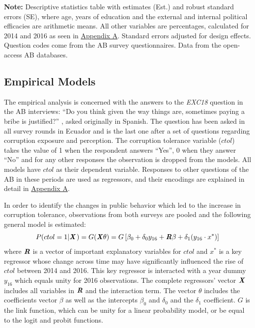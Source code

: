 \documentclass[12pt,a4]{article}\usepackage[]{graphicx}\usepackage[]{xcolor}
\begin{document}
\begin{table}[htbp!]
\begin{center}
\begin{tabular}{llcccc}
\bottomrule
\end{tabular}
\end{center}
\doublespacing
\textbf{Note:} Descriptive statistics table with estimates (Est.) and robust standard errors (SE), where age, years of education and the external and internal political efficacies are arithmetic means. All other variables are percentages, calculated for 2014 and 2016 as seen in \hyperref[app:first]{Appendix A}. Standard errors adjusted for design effects. Question codes come from the AB survey questionnaires. Data from the open-access AB databases.
\end{table}

\subsection{Empirical Models}

The empirical analysis is concerned with the answers to the \emph{EXC18} question in the AB interviews: 
\enquote{Do you think given the way things are, sometimes paying a bribe is justified?} \parencite[p.96]{Moscoso.2018}, asked originally in Spanish. The question has been asked in all survey rounds in Ecuador and is the last one after a set of questions regarding corruption exposure and perception. The corruption tolerance variable ($ctol$) takes the value of 1 when the respondent answers \enquote{Yes}, 0 when they answer \enquote{No} and for any other responses the observation is dropped from the models. All models have $ctol$ as their dependent variable. Responses to other questions of the AB in these periods are used as regressors, and their encodings are explained in detail in \href{app:first}{Appendix A}.

In order to identify the changes in public behavior which led to the increase in corruption tolerance, observations from both surveys are pooled and the following general model is estimated: 
\begin{equation}
\label{eqn:genmod}
P(ctol = 1 | \textbf{\textit{X}} \hspace{0.04cm}) = G (\textbf{\textit{X}} \theta ) = G \left[ \beta_0 + \delta_0 y_{16} + \textbf{\textit{R}}\beta + \delta_1 (y_{16} \cdot x^*) \right]
\end{equation}
where $\textbf{\textit{R}}$ is a vector of important explanatory variables for $ctol$ and $x^*$ is a key regressor whose change across time may have significantly influenced the rise of $ctol$ between 2014 and 2016. This key regressor is interacted with a year dummy $y_{16}$ which equals unity for 2016 observations. The complete regressors' vector $\textbf{\textit{X}}$ includes all variables in $\textbf{\textit{R}}$ and the interaction term. The vector $\theta$ includes the coefficients vector $\beta$ as well as the intercepts $\beta_0$ and $\delta_0$ and the $\delta_1$ coefficient. $G$ is the link function, which can be unity for a linear probability model, or be equal to the logit and probit functions.
\end{document}
